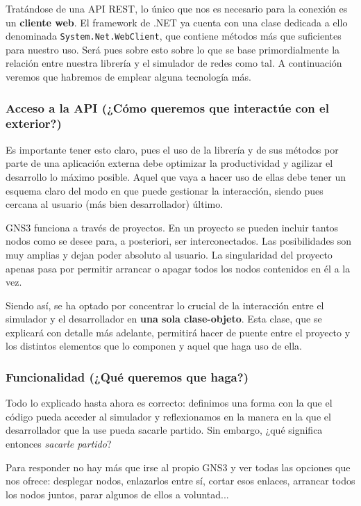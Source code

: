 Tratándose de una API REST, lo único que nos es necesario para la conexión es un \textbf{cliente web}. El framework de .NET ya cuenta con una clase dedicada a ello denominada \texttt{System.Net.WebClient}\cite{webclient}, que contiene métodos más que suficientes para nuestro uso. Será pues sobre esto sobre lo que se base primordialmente la relación entre nuestra librería y el simulador de redes como tal. A continuación veremos que habremos de emplear alguna tecnología más.

\subsubsection[Acceso a la API]{Acceso a la API (¿Cómo queremos que interactúe con el exterior?)}\label{subsec:accesoapi}
Es importante tener esto claro, pues el uso de la librería y de sus métodos por parte de una aplicación externa debe optimizar la productividad y agilizar el desarrollo lo máximo posible. Aquel que vaya a hacer uso de ellas debe tener un esquema claro del modo en que puede gestionar la interacción, siendo pues cercana al usuario (más bien desarrollador) último.

GNS3 funciona a través de proyectos. En un proyecto se pueden incluir tantos nodos como se desee para, a posteriori, ser interconectados. Las posibilidades son muy amplias y dejan poder absoluto al usuario. La singularidad del proyecto apenas pasa por permitir arrancar o apagar todos los nodos contenidos en él a la vez.

Siendo así, se ha optado por concentrar lo crucial de la interacción entre el simulador y el desarrollador en \textbf{una sola clase-objeto}. Esta clase, que se explicará con detalle más adelante, permitirá hacer de puente entre el proyecto y los distintos elementos que lo componen y aquel que haga uso de ella.

\subsubsection[Funcionalidad]{Funcionalidad (¿Qué queremos que haga?)}
Todo lo explicado hasta ahora es correcto: definimos una forma con la que el código pueda acceder al simulador y reflexionamos en la manera en la que el desarrollador que la use pueda sacarle partido. Sin embargo, ¿qué significa entonces \textit{sacarle partido}?

Para responder no hay más que irse al propio GNS3 y ver todas las opciones que nos ofrece: desplegar nodos, enlazarlos entre sí, cortar esos enlaces, arrancar todos los nodos juntos, parar algunos de ellos a voluntad... 

